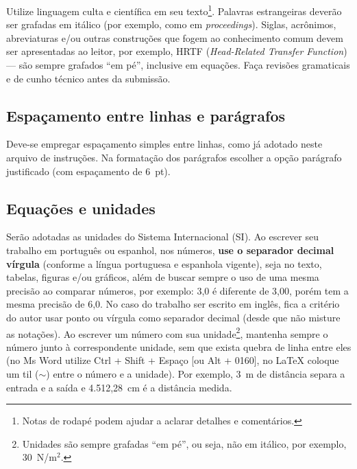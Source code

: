
Utilize linguagem culta e científica em seu texto\footnote{Notas de rodapé podem ajudar a aclarar detalhes e comentários.}. Palavras estrangeiras deverão ser grafadas em itálico (por exemplo, como em \textit{proceedings}). Siglas, acrônimos, abreviaturas e/ou outras construções que fogem ao conhecimento comum devem ser apresentadas ao leitor, por exemplo, HRTF (\textit{Head-Related Transfer Function}) --- são sempre grafados ``em pé'', inclusive em equações.
Faça revisões gramaticais e de cunho técnico antes da submissão.

\subsection{Espaçamento entre linhas e parágrafos}

Deve-se empregar espaçamento simples entre linhas, como já adotado neste arquivo de instruções.
Na formatação dos parágrafos escolher a opção parágrafo justificado (com espaçamento de 6~pt).


\subsection{Equações e unidades}

Serão adotadas as unidades do Sistema Internacional (SI). Ao escrever seu trabalho em português ou espanhol, nos números, \textbf{use o separador decimal vírgula} (conforme a língua portuguesa e espanhola vigente), seja no texto, tabelas, figuras e/ou gráficos, além de buscar sempre o uso de uma mesma precisão ao comparar números, por exemplo: 3,0 é diferente de 3,00, porém tem a mesma precisão de 6,0. 
No caso do trabalho ser escrito em inglês, fica a critério do autor usar ponto ou vírgula como separador decimal (desde que não misture as notações).
Ao escrever um número com sua unidade\footnote{Unidades são sempre grafadas ``em pé'', ou seja, não em itálico, por exemplo, 30~N/m$^2$.}, mantenha sempre o número junto à correspondente unidade, sem que exista quebra de linha entre eles (no Ms Word utilize Ctrl + Shift + Espaço [ou Alt + 0160], no \LaTeX\xspace coloque um til ($\sim$) entre o número e a unidade). Por exemplo, 3~m de distância separa a entrada e a saída e 4.512,28~cm é a distância medida.

